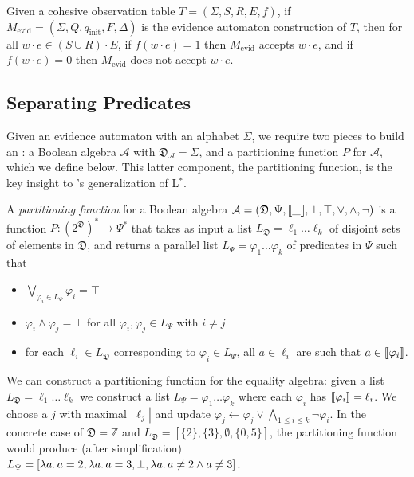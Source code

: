 \begin{lemma}\label{thm:evid}
    Given a cohesive observation table $T = (\Sigma, S, R, E, f)$,
    if $M_\text{evid} = (\Sigma, Q, q_\text{init}, F, \Delta)$ 
    is the evidence automaton construction of $T$,
    then for all $w \cdot e \in (S \cup R) \cdot E$,
    if $f(w \cdot e) = 1$ then $M_\text{evid}$ accepts $w \cdot e$, and
    if $f(w \cdot e) = 0$ then $M_\text{evid}$ does not accept $w \cdot e$.
\end{lemma}

\subsection{Separating Predicates}

Given an evidence automaton with an alphabet $\Sigma$,
we require two pieces to build an \SFA:
\rone a Boolean algebra $\mathcal{A}$ with $\mathfrak{D}_\mathcal{A} = \Sigma$,
and \rtwo a partitioning function $P$ for $\mathcal{A}$, which we define below.
%
This latter component,
the partitioning function,
is the key insight to \alg's
generalization of L$^*$.

\begin{definition}
    A \emph{partitioning function} for a Boolean algebra
    $\mathcal{A} = (\mathfrak{D}, \Psi, \llbracket {\_} \rrbracket, \bot, \top, \vee, \wedge, \neg)$
    is a function $P : (2^\mathfrak{D})^* \rightarrow \Psi^*$
    that takes as input a list $L_\mathfrak{D} = \ell_1 \ldots \ell_k$
    of disjoint sets of elements in $\mathfrak{D}$,
    and returns a parallel list $L_\Psi = \varphi_1 \ldots \varphi_k$ of predicates in $\Psi$ such that
    \begin{itemize}
        \item $\bigvee_{\varphi_i \in L_\Psi} \varphi_i = \top$
        \item $\varphi_i \wedge \varphi_j = \bot$ for all $\varphi_i, \varphi_j \in L_\Psi$ with $i \neq j$
        \item for each $\ell_i \in L_\mathfrak{D}$ corresponding to $\varphi_i \in L_\Psi$,
            all $a \in \ell_i$ are such that $a \in \llbracket {\varphi_i} \rrbracket$.
    \end{itemize}
\end{definition}

\begin{example}
    We can construct a partitioning function for the equality algebra:
    given a list
    $L_\mathfrak{D} = \ell_1 \ldots \ell_k$
    we construct a list $L_\Psi = \varphi_1 \ldots \varphi_k$
    where each $\varphi_i$ has $\llbracket {\varphi_i} \rrbracket = \ell_i$.
    We choose a $j$ with maximal $|\ell_j|$
    and update $\varphi_j \gets \varphi_j \vee \bigwedge_{1 \leq i \leq k} \neg \varphi_i$.
    In the concrete case of $\mathfrak{D} = \mathbb{Z}$ 
    and $L_\mathfrak{D} = [\{2\}, \{3\}, \emptyset, \{0, 5\}]$,
    the partitioning function would produce (after simplification)
    $L_\Psi = [\lambda a \ldotp a = 2, \lambda a \ldotp a = 3, \bot, \lambda a \ldotp a \neq 2 \wedge a \neq 3]$.
\end{example}


